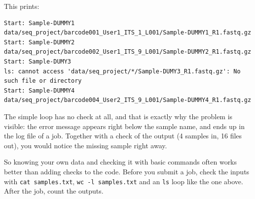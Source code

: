 \documentclass[
  letterpaper,
  DIV=11,
  numbers=noendperiod]{scrreprt}
\begin{document}
This prints:

\begin{verbatim}
Start: Sample-DUMMY1
data/seq_project/barcode001_User1_ITS_1_L001/Sample-DUMMY1_R1.fastq.gz
Start: Sample-DUMMY2
data/seq_project/barcode002_User1_ITS_9_L001/Sample-DUMMY2_R1.fastq.gz
Start: Sample-DUMY3
ls: cannot access 'data/seq_project/*/Sample-DUMY3_R1.fastq.gz': No such file or directory
Start: Sample-DUMMY4
data/seq_project/barcode004_User2_ITS_9_L001/Sample-DUMMY4_R1.fastq.gz
\end{verbatim}

The simple loop has no check at all, and that is exactly why the problem
is visible: the error message appears right below the sample name, and
ends up in the log file of a job. Together with a check of the output (4
samples in, 16 files out), you would notice the missing sample right
away.

So knowing your own data and checking it with basic commands often works
better than adding checks to the code. Before you submit a job, check
the inputs with \texttt{cat\ samples.txt}, \texttt{wc\ -l\ samples.txt}
and an \texttt{ls} loop like the one above. After the job, count the
outputs.
\end{document}
